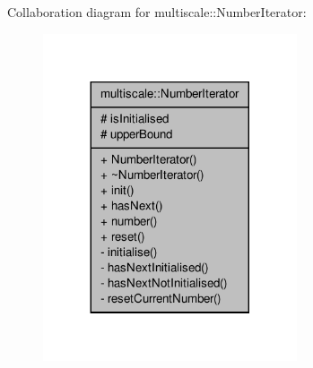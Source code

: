 Collaboration diagram for multiscale\-:\-:Number\-Iterator\-:\nopagebreak
\begin{figure}[H]
\begin{center}
\leavevmode
\includegraphics[width=212pt]{classmultiscale_1_1NumberIterator__coll__graph}
\end{center}
\end{figure}
